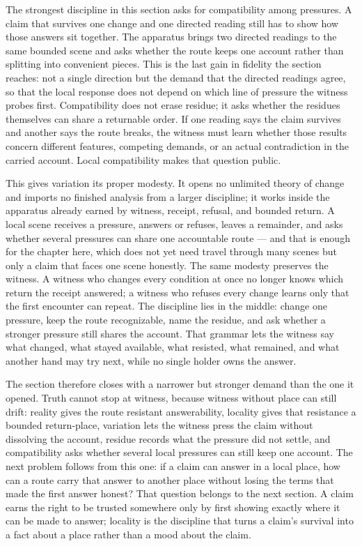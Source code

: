 The strongest discipline in this section asks for compatibility among pressures. A claim that survives one change and one directed reading still has to show how those answers sit together. The apparatus brings two directed readings to the same bounded scene and asks whether the route keeps one account rather than splitting into convenient pieces. This is the last gain in fidelity the section reaches: not a single direction but the demand that the directed readings agree, so that the local response does not depend on which line of pressure the witness probes first. Compatibility does not erase residue; it asks whether the residues themselves can share a returnable order. If one reading says the claim survives and another says the route breaks, the witness must learn whether those results concern different features, competing demands, or an actual contradiction in the carried account. Local compatibility makes that question public.

This gives variation its proper modesty. It opens no unlimited theory of change and imports no finished analysis from a larger discipline; it works inside the apparatus already earned by witness, receipt, refusal, and bounded return. A local scene receives a pressure, answers or refuses, leaves a remainder, and asks whether several pressures can share one accountable route --- and that is enough for the chapter here, which does not yet need travel through many scenes but only a claim that faces one scene honestly. The same modesty preserves the witness. A witness who changes every condition at once no longer knows which return the receipt answered; a witness who refuses every change learns only that the first encounter can repeat. The discipline lies in the middle: change one pressure, keep the route recognizable, name the residue, and ask whether a stronger pressure still shares the account. That grammar lets the witness say what changed, what stayed available, what resisted, what remained, and what another hand may try next, while no single holder owns the answer.

The section therefore closes with a narrower but stronger demand than the one it opened. Truth cannot stop at witness, because witness without place can still drift: reality gives the route resistant answerability, locality gives that resistance a bounded return-place, variation lets the witness press the claim without dissolving the account, residue records what the pressure did not settle, and compatibility asks whether several local pressures can still keep one account. The next problem follows from this one: if a claim can answer in a local place, how can a route carry that answer to another place without losing the terms that made the first answer honest? That question belongs to the next section. A claim earns the right to be trusted somewhere only by first showing exactly where it can be made to answer; locality is the discipline that turns a claim's survival into a fact about a place rather than a mood about the claim.

